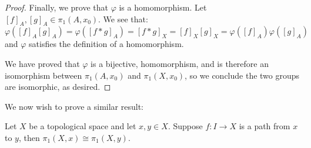 \begin{proof}
Finally, we prove that $\varphi$ is a homomorphism. Let $[f]_A,[g]_A\in \pi_1(A,x_0)$. We see that:
\[\varphi([f]_A[g]_A) =  \varphi([f*g]_A) = [f*g]_X = [f]_X [g]_X = \varphi([f]_A)\varphi([g]_A)\]
and $\varphi$ satisfies the definition of a homomorphism.

We have proved that $\varphi$ is a bijective, homomorphism, and is therefore an isomorphism between $\pi_1(A,x_0)$ and $\pi_1(X,x_0)$, so we conclude the two groups are isomorphic, as desired.
\end{proof}

We now wish to prove a similar result:
\begin{theorem}
Let $X$ be a topological space and let $x,y\in X$. Suppose $f:I\to X$ is a path from $x$ to $y$, then $\pi_1(X,x)\cong \pi_1(X,y)$. 
\end{theorem}

